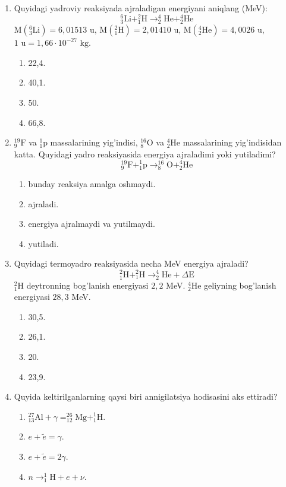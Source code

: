 \begin{enumerate}
\item Quyidagi yadroviy reaksiyada ajraladigan energiyani aniqlang (MeV):
$$^6_3\text{Li} + ^2_1\text{H} \rightarrow ^4_2\text{He} + ^4_2\text{He}$$
$\text{M}(^6_3\text{Li})=6,01513\text{ u}$, $\text{M}(^2_1\text{H})=2,01410\text{ u}$, $\text{M}(^4_2\text{He})=4,0026\text{ u}$, $1\text{ u}=1,66\cdot 10^{-27}\text{ kg}$.
\begin{enumerate}[label=\Alph*)]
\item 22,4.
\item 40,1.
\item 50.
\item 66,8.
\end{enumerate}

\item $^{19}_9\text{F}$ va $^1_1\text{p}$ massalarining yig'indisi, $^{16}_8\text{O}$ va $^4_2\text{He}$ massalarining yig'indisidan katta. Quyidagi yadro reaksiyasida energiya ajraladimi yoki yutiladimi?
$$^{19}_9\text{F} + ^1_1\text{p} \rightarrow ^{16}_8\text{O} + ^4_2\text{He}$$
\begin{enumerate}[label=\Alph*)]
\item bunday reaksiya amalga oshmaydi.
\item ajraladi.
\item energiya ajralmaydi va yutilmaydi.
\item yutiladi.
\end{enumerate}

\item Quyidagi termoyadro reaksiyasida necha MeV energiya ajraladi?
$$^2_1\text{H} + ^2_1\text{H} \rightarrow ^4_2\text{He} + \Delta\text{E}$$
$^2_1\text{H}$ deytronning bog'lanish energiyasi $2,2$ MeV.
$^4_2\text{He}$ geliyning bog'lanish energiyasi $28,3$ MeV.
\begin{enumerate}[label=\Alph*)]
\item 30,5.
\item 26,1.
\item 20.
\item 23,9.
\end{enumerate}

\item Quyida keltirilganlarning qaysi biri annigilatsiya hodisasini aks ettiradi?
\begin{enumerate}[label=\Alph*)]
\item $^{27}_{13}\text{Al} + \gamma = ^{26}_{12}\text{Mg} + ^1_1\text{H}$.
\item $e + \tilde{e} = \gamma$.
\item $e + \tilde{e} = 2\gamma$.
\item $n \rightarrow ^1_1\text{H} + e + \nu$.
\end{enumerate}

\end{enumerate}





